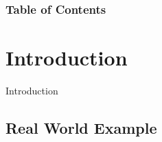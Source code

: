 \documentclass[xcolor=dvipsnames, aspectratio=169]{beamer}
\begin{document}
\begin{frame}
\frametitle{Table of Contents}
\tableofcontents
\end{frame}

\section{Introduction}

\begin{frame}
	\centering
	\Huge
	Introduction
\end{frame}
\subsection{Real World Example}
\end{document}
